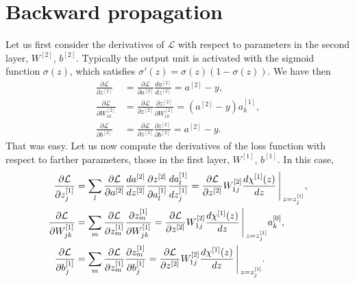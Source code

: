 \documentclass[aps,10pt]{revtex4}
\theoremstyle{plain}
\theoremstyle{definition}
\theoremstyle{remark}
\begin{document}
\section{Backward propagation}
\noindent Let us first consider the derivatives of $\mathcal{L}$ with respect to parameters in the second layer, $W^{[2]}$, $b^{[2]}$. Typically the output unit is activated with the sigmoid function $\sigma(z)$, which satisfies $\sigma'(z) = \sigma(z)(1-\sigma(z))$. We have then
\begin{equation}
 \begin{aligned}
 	\frac{\partial\mathcal{L}}{\partial z^{[2]}} & = \frac{\partial\mathcal{L}}{\partial a^{[2]}}\frac{d a^{[2]}}{d z^{[2]}} = a^{[2]}-y,\\
	\frac{\partial\mathcal{L}}{\partial W_{1k}^{[2]}} & = \frac{\partial\mathcal{L}}{\partial z^{[2]}}\frac{\partial z^{[2]}}{\partial W_{1k}^{[2]}} = \left(a^{[2]}-y\right)a^{[1]}_k, \\
	\frac{\partial\mathcal{L}}{\partial b^{[2]}} & = \frac{\partial\mathcal{L}}{\partial z^{[2]}}\frac{\partial z^{[2]}}{\partial b^{[2]}} = a^{[2]}-y.
 \end{aligned}
\end{equation}
That was easy. Let us now compute the derivatives of the loss function with respect to farther parameters, those in the first layer, $W^{[1]}$, $b^{[1]}$. In this case,
\begin{equation}
 \begin{aligned}
 \frac{\partial\mathcal{L}}{\partial z^{[1]}_j} & = \sum_l\frac{\partial\mathcal{L}}{\partial a^{[2]}}\frac{d a^{[2]}}{d z^{[2]}}\frac{\partial z^{[2]}}{\partial a^{[1]}_l}\frac{d a^{[1]}_l}{d z^{[1]}_j} = \frac{\partial\mathcal{L}}{\partial z^{[2]}} W^{[2]}_{1j}\frac{d\chi^{[1]}(z)}{dz}{\Bigg\arrowvert}_{z=z^{[1]}_j},\\ 
  \frac{\partial\mathcal{L}}{\partial W^{[1]}_{jk}} & = \sum_{m}\frac{\partial\mathcal{L}}{\partial z^{[1]}_m}\frac{\partial z^{[1]}_m}{\partial W_{jk}^{[1]}}  = \frac{\partial\mathcal{L}}{\partial z^{[2]}} W^{[2]}_{1j}\frac{d\chi^{[1]}(z)}{dz}{\Bigg\arrowvert}_{z=z^{[1]}_j}a_k^{[0]}, \\
  \frac{\partial\mathcal{L}}{\partial b^{[1]}_{j}} & = \sum_{m}\frac{\partial\mathcal{L}}{\partial z^{[1]}_m}\frac{\partial z^{[1]}_m}{\partial b_{j}^{[1]}}  = \frac{\partial\mathcal{L}}{\partial z^{[2]}} W^{[2]}_{1j}\frac{d\chi^{[1]}(z)}{dz}{\Bigg\arrowvert}_{z=z^{[1]}_j}.
 \end{aligned}
\end{equation}
\end{document}
